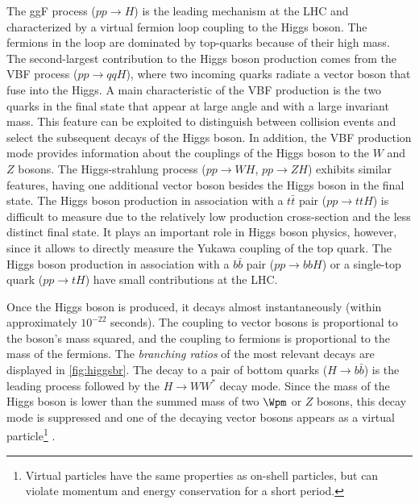 The ggF process ($pp\rightarrow H$) is the leading mechanism at the LHC and characterized by a virtual fermion loop coupling to the Higgs boson. 
The fermions in the loop are dominated by top-quarks because of their high mass. 
The second-largest contribution to the Higgs boson production comes from the VBF process ($pp\rightarrow qqH$), where two incoming quarks radiate a vector boson that fuse into the Higgs.
A main characteristic of the VBF production is the two quarks in the final state that appear at large angle and with a large invariant mass.
This feature can be exploited to distinguish between collision events and select the subsequent decays of the Higgs boson. 
In addition, the VBF production mode provides information about the couplings of the Higgs boson to the $W$ and $Z$ bosons. 
The Higgs-strahlung process ($pp \rightarrow WH$, $pp \rightarrow ZH$) exhibits similar features, having one additional vector boson besides the Higgs boson in the final state.
The Higgs boson production in association with a $t\bar{t}$ pair ($pp \rightarrow ttH$) is difficult to measure due to the relatively low production cross-section and the less distinct final state. It plays an important role in Higgs boson physics, however, since it allows to directly measure the Yukawa coupling of the top quark. 
The Higgs boson production in association with a $b\bar{b}$ pair ($pp\rightarrow bbH$) or a single-top quark ($pp \rightarrow tH$) have small contributions at the LHC.


Once the Higgs boson is produced, it decays almost instantaneously (within approximately $10^{-22}$ seconds).
The coupling to vector bosons is proportional to the boson's mass squared, and the coupling to fermions is proportional to the mass of the fermions. The \emph{branching ratios} of the most relevant decays are displayed in \cref{fig:higgsbr}. 
The decay to a pair of bottom quarks ($H\rightarrow b\bar{b}$) is the leading process followed by the $H\rightarrow WW^*$ decay mode. Since the mass of the Higgs boson is lower than the summed mass of two $\Wpm$ or $Z$ bosons, this decay mode is suppressed and one of the decaying vector bosons appears as a virtual particle\footnote{Virtual particles have the same properties as on-shell particles, but can violate momentum and energy conservation for a short period.} .


